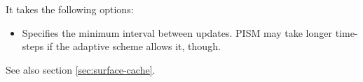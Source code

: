 \documentclass[titlepage,letterpaper,final]{scrartcl}
\begin{document}
It takes the following options:
\begin{itemize}
\item {} Specifies the
  minimum interval between updates. PISM may take longer time-steps if
  the adaptive scheme allows it, though.
\end{itemize}

See also section \ref{sec:surface-cache}.


\clearpage\newpage



{}
\label{sec:index}
{\small \printindex }

{}
{\small \printindex[options]}
\end{document}
